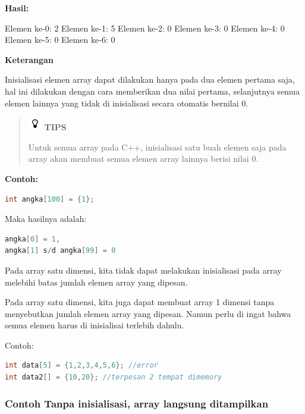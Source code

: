 \textbf{Hasil:}

\begin{lcverbatim}
	Elemen ke-0: 2
	Elemen ke-1: 5
	Elemen ke-2: 0
	Elemen ke-3: 0
	Elemen ke-4: 0
	Elemen ke-5: 0
	Elemen ke-6: 0
\end{lcverbatim}

\textbf{Keterangan}

Inisialisasi elemen array dapat dilakukan hanya pada dua elemen pertama
saja, hal ini dilakukan dengan cara memberikan dua nilai pertama,
selanjutnya semua elemen lainnya yang tidak di inisialisasi secara
otomatis bernilai 0.

\begin{quotation}
\includegraphics{../manuscript/images/tips.png}	\textbf{TIPS}
	
	Untuk
	semua array pada C++, inisialisasi satu buah elemen saja pada array akan
	membuat semua elemen array lainnya berisi nilai 0.
\end{quotation}
 

\textbf{Contoh:}

\begin{lstlisting}[language=c++, numbers=none]
int angka[100] = {1};
\end{lstlisting}

Maka hasilnya adalah:

\begin{lstlisting}[language=c++, numbers=none]
angka[0] = 1,
angka[1] s/d angka[99] = 0
\end{lstlisting}

Pada array satu dimensi, kita tidak dapat melakukan inisialisasi pada
array melebihi batas jumlah elemen array yang dipesan.

Pada array satu dimensi, kita juga dapat membuat array 1 dimensi tanpa
menyebutkan jumlah elemen array yang dipesan. Namun perlu di ingat bahwa
semua elemen harus di inisialisai terlebih dahulu.

Contoh:

\begin{lstlisting}[language=c++, numbers=none]
int data[5] = {1,2,3,4,5,6}; //error
int data2[] = {10,20}; //terpesan 2 tempat dimemory
\end{lstlisting}

\subsubsection*{Contoh  Tanpa inisialisasi, array langsung ditampilkan}


